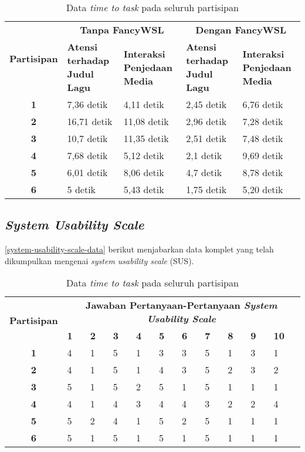 \begin{table}[h]
    \centering
    \caption{Data \textit{time to task} pada seluruh partisipan}
    \label{time-to-task-data}
    \begin{tabularx}{\linewidth}{|c|X|X|X|X|} \hline
        \multirow{2}{*}{\textbf{Partisipan}} & \multicolumn{2}{c|}{\textbf{Tanpa FancyWSL}} & \multicolumn{2}{c|}{\textbf{Dengan FancyWSL}}\\ \cline{2-5}
        & \textbf{Atensi terhadap Judul Lagu} & \textbf{Interaksi Penjedaan Media} & \textbf{Atensi terhadap Judul Lagu} & \textbf{Interaksi Penjedaan Media}\\ \hline
        \textbf{1} & 7,36 detik & 4,11 detik & 2,45 detik & 6,76 detik\\ \hline
        \textbf{2} & 16,71 detik & 11,08 detik & 2,96 detik & 7,28 detik\\ \hline
        \textbf{3} & 10,7 detik & 11,35 detik & 2,51 detik & 7,48 detik \\ \hline
        \textbf{4} & 7,68 detik & 5,12 detik & 2,1 detik & 9,69 detik \\ \hline
        \textbf{5} & 6,01 detik & 8,06 detik & 4,7 detik & 8,78 detik \\ \hline
        \textbf{6} & 5 detik & 5,43 detik & 1,75 detik & 5,20 detik \\ \hline
    \end{tabularx}
\end{table}

\subsection{\textit{System Usability Scale}}

\autoref{system-usability-scale-data} berikut menjabarkan data komplet yang telah dikumpulkan mengenai \textit{system usability scale} (SUS).

\begin{table}[h]
    \centering
    \caption{Data \textit{time to task} pada seluruh partisipan}
    \label{system-usability-scale-data}
    \begin{tabularx}{\linewidth}{|c|X|X|X|X|X|X|X|X|X|X|} \hline
        \multirow{2}{*}{\textbf{Partisipan}} & \multicolumn{10}{c|}{\textbf{Jawaban Pertanyaan-Pertanyaan \textit{System Usability Scale}}}\\ \cline{2-11}
        & \textbf{1} & \textbf{2} & \textbf{3} & \textbf{4} & \textbf{5} & \textbf{6} & \textbf{7} & \textbf{8} & \textbf{9} & \textbf{10}\\ \hline
        \textbf{1} & 4 & 1 & 5 & 1 & 3 & 3 & 5 & 1 & 3 & 1\\ \hline
        \textbf{2} & 4 & 1 & 5 & 1 & 4 & 3 & 5 & 2 & 3 & 2\\ \hline
        \textbf{3} & 5 & 1 & 5 & 2 & 5 & 1 & 5 & 1 & 1 & 1\\ \hline
        \textbf{4} & 4 & 1 & 4 & 3 & 4 & 4 & 3 & 2 & 2 & 4\\ \hline
        \textbf{5} & 5 & 2 & 4 & 1 & 5 & 2 & 5 & 1 & 1 & 1\\ \hline
        \textbf{6} & 5 & 1 & 5 & 1 & 5 & 1 & 5 & 1 & 1 & 1\\ \hline
    \end{tabularx}
\end{table}
